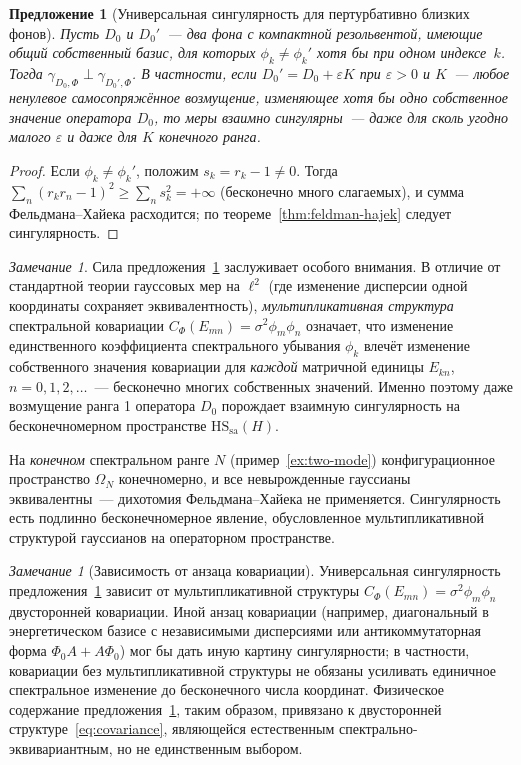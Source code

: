 \documentclass[12pt,a4paper]{article}
\theoremstyle{plain}
\newtheorem{proposition}[theorem]{Предложение}
\theoremstyle{definition}
\theoremstyle{remark}
\newtheorem{remark}[theorem]{Замечание}
\newcommand{\HS}{\mathrm{HS}}
\newcommand{\sa}{\mathrm{sa}}
\begin{document}
\begin{proposition}[Универсальная сингулярность для пертурбативно
близких фонов]
\label{prop:fh-close}
Пусть $D_0$ и $D_0'$~--- два фона с компактной резольвентой,
\emph{имеющие общий собственный базис}, для которых
$\phi_k \ne \phi_k'$ хотя бы при одном индексе~$k$.
Тогда $\gamma_{D_0,\Phi} \perp \gamma_{D_0',\Phi}$.
В частности, если $D_0' = D_0 + \varepsilon K$ при $\varepsilon > 0$
и $K$~--- любое ненулевое самосопряжённое возмущение, изменяющее
хотя бы одно собственное значение оператора $D_0$, то меры
взаимно сингулярны~--- даже для сколь угодно малого $\varepsilon$
и даже для $K$ конечного ранга.
\end{proposition}

\begin{proof}
Если $\phi_k \ne \phi_k'$, положим $s_k = r_k - 1 \ne 0$.  Тогда
$\sum_n (r_k r_n - 1)^2 \ge \sum_n s_k^2 = +\infty$
(бесконечно много слагаемых), и сумма Фельдмана--Хайека
расходится; по теореме~\ref{thm:feldman-hajek} следует
сингулярность.
\end{proof}

\begin{remark}\label{rem:fh-sharpness}
Сила предложения~\ref{prop:fh-close} заслуживает особого
внимания.  В отличие от стандартной теории гауссовых мер
на $\ell^2$ (где изменение дисперсии одной координаты
сохраняет эквивалентность), \emph{мультипликативная структура}
спектральной ковариации
$C_\Phi(E_{mn}) = \sigma^2\phi_m\phi_n$ означает, что
изменение единственного коэффициента спектрального
убывания $\phi_k$ влечёт изменение собственного значения
ковариации для \emph{каждой} матричной единицы $E_{kn}$,
$n = 0,1,2,\ldots$~--- бесконечно многих собственных значений.
Именно поэтому даже возмущение ранга 1 оператора $D_0$
порождает взаимную сингулярность на бесконечномерном
пространстве $\HS_\sa(H)$.

На \emph{конечном} спектральном ранге $N$ (пример~\ref{ex:two-mode})
конфигурационное пространство $\Omega_N$ конечномерно, и все
невырожденные гауссианы эквивалентны~--- дихотомия
Фельдмана--Хайека не применяется.  Сингулярность есть
подлинно бесконечномерное явление, обусловленное
мультипликативной структурой гауссианов на операторном
пространстве.
\end{remark}

\begin{remark}[Зависимость от анзаца ковариации]
Универсальная сингулярность предложения~\ref{prop:fh-close} зависит от
мультипликативной структуры
$C_\Phi(E_{mn}) = \sigma^2\phi_m\phi_n$
двусторонней ковариации.  Иной анзац ковариации (например,
диагональный в энергетическом базисе с независимыми
дисперсиями или антикоммутаторная форма
$\Phi_0 A + A\Phi_0$) мог бы дать иную картину сингулярности;
в частности, ковариации без мультипликативной структуры не
обязаны усиливать единичное спектральное изменение до
бесконечного числа координат.  Физическое содержание
предложения~\ref{prop:fh-close}, таким образом, привязано
к двусторонней структуре~\eqref{eq:covariance}, являющейся
естественным спектрально-эквивариантным, но не единственным
выбором.
\end{remark}
\end{document}
